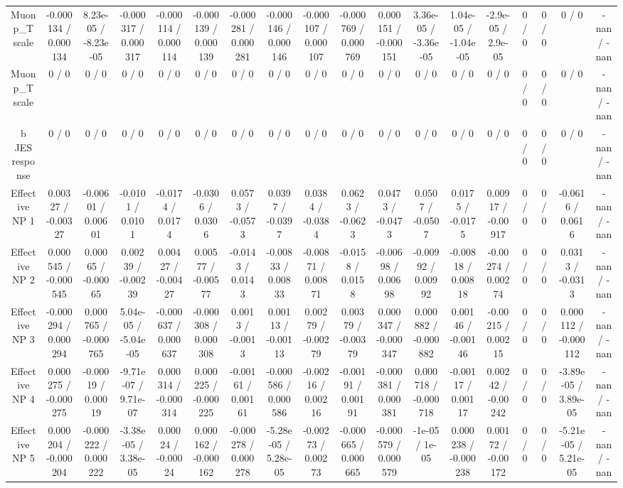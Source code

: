 \documentclass[10pt]{article}
\begin{document}
\begin{table}[htbp]
\begin{center}
\begin{tabular}{|c|c|c|c|c|c|c|c|c|c|c|c|c|c|c|c|c|c|}
  Muon p_{T} scale & -0.000134 / 0.000134 & 8.23e-05 / -8.23e-05 & -0.000317 / 0.000317 & -0.000114 / 0.000114 & -0.000139 / 0.000139 & -0.000281 / 0.000281 & -0.000146 / 0.000146 & -0.000107 / 0.000107 & -0.000769 / 0.000769 & 0.000151 / -0.000151 & 3.36e-05 / -3.36e-05 & 1.04e-05 / -1.04e-05 & -2.9e-05 / 2.9e-05 & 0 / 0 & 0 / 0 & 0 / 0 & -nan / -nan \\ 
  Muon p_{T} scale & 0 / 0 & 0 / 0 & 0 / 0 & 0 / 0 & 0 / 0 & 0 / 0 & 0 / 0 & 0 / 0 & 0 / 0 & 0 / 0 & 0 / 0 & 0 / 0 & 0 / 0 & 0 / 0 & 0 / 0 & 0 / 0 & -nan / -nan \\ 
  b JES response & 0 / 0 & 0 / 0 & 0 / 0 & 0 / 0 & 0 / 0 & 0 / 0 & 0 / 0 & 0 / 0 & 0 / 0 & 0 / 0 & 0 / 0 & 0 / 0 & 0 / 0 & 0 / 0 & 0 / 0 & 0 / 0 & -nan / -nan \\ 
  Effective NP 1 & 0.00327 / -0.00327 & -0.00601 / 0.00601 & -0.0101 / 0.0101 & -0.0174 / 0.0174 & -0.0306 / 0.0306 & 0.0573 / -0.0573 & 0.0397 / -0.0397 & 0.0384 / -0.0384 & 0.0623 / -0.0623 & 0.0473 / -0.0473 & 0.0507 / -0.0507 & 0.0175 / -0.0175 & 0.00917 / -0.00917 & 0 / 0 & 0 / 0 & -0.0616 / 0.0616 & -nan / -nan \\ 
  Effective NP 2 & 0.000545 / -0.000545 & 0.00065 / -0.00065 & 0.00239 / -0.00239 & 0.00427 / -0.00427 & 0.00577 / -0.00577 & -0.0143 / 0.0143 & -0.00833 / 0.00833 & -0.00871 / 0.00871 & -0.0158 / 0.0158 & -0.00698 / 0.00698 & -0.00992 / 0.00992 & -0.00818 / 0.00818 & -0.00274 / 0.00274 & 0 / 0 & 0 / 0 & 0.0313 / -0.0313 & -nan / -nan \\ 
  Effective NP 3 & -0.000294 / 0.000294 & 0.000765 / -0.000765 & 5.04e-05 / -5.04e-05 & -0.000637 / 0.000637 & -0.000308 / 0.000308 & 0.0013 / -0.0013 & 0.00113 / -0.00113 & 0.00279 / -0.00279 & 0.00379 / -0.00379 & 0.000347 / -0.000347 & 0.000882 / -0.000882 & 0.00146 / -0.00146 & -0.00215 / 0.00215 & 0 / 0 & 0 / 0 & 0.000112 / -0.000112 & -nan / -nan \\ 
  Effective NP 4 & 0.000275 / -0.000275 & -0.00019 / 0.00019 & -9.71e-07 / 9.71e-07 & 0.000314 / -0.000314 & 0.000225 / -0.000225 & -0.00161 / 0.00161 & -0.000586 / 0.000586 & -0.00216 / 0.00216 & -0.00191 / 0.00191 & -0.000381 / 0.000381 & 0.000718 / -0.000718 & -0.00117 / 0.00117 & 0.00242 / -0.00242 & 0 / 0 & 0 / 0 & -3.89e-05 / 3.89e-05 & -nan / -nan \\ 
  Effective NP 5 & 0.000204 / -0.000204 & -0.000222 / 0.000222 & -3.38e-05 / 3.38e-05 & 0.00024 / -0.00024 & 0.000162 / -0.000162 & -0.000278 / 0.000278 & -5.28e-05 / 5.28e-05 & -0.00273 / 0.00273 & -0.000665 / 0.000665 & -0.000579 / 0.000579 & -1e-05 / 1e-05 & 0.000238 / -0.000238 & 0.00172 / -0.00172 & 0 / 0 & 0 / 0 & -5.21e-05 / 5.21e-05 & -nan / -nan \\ 

\end{tabular}
\end{center}
\end{table}
\end{document}
